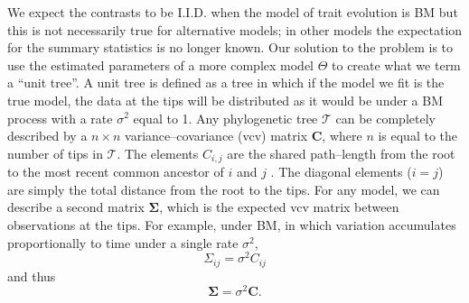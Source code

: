 \documentclass[a4paper,12pt]{article}
\begin{document}
We expect the contrasts to be I.I.D. when the model of trait evolution is BM but this is not necessarily true for alternative models; in other models the expectation for the summary statistics is no longer known. Our solution to the problem is to use the estimated parameters of a more complex model $\Theta$ to create what we term a ``unit tree''. A unit tree is defined as a tree in which if the model we fit is the true model, the data at the tips will be distributed as it would be under a BM process with a rate $\sigma^2$ equal to 1. Any phylogenetic tree $\mathcal{T}$ can be completely described by a $n \times n$ variance--covariance (vcv) matrix $\mathbf{C}$, where $n$ is equal to the number of tips in $\mathcal{T}$. The elements $C_{i,j}$ are the shared path--length from the root to the most recent common ancestor of $i$ and $j$ \citep{Piazza1975}. The diagonal elements ($i = j$) are simply the total distance from the root to the tips. For any model, we can describe a second matrix $\mathbf{\Sigma}$, which is the expected vcv matrix between observations at the tips. For example, under BM, in which variation accumulates proportionally to time under a single rate $\sigma^2$,
\begin{equation}
\Sigma_{ij} = \sigma^2 C_{ij}
\end{equation}
and thus
\begin{equation}
\mathbf{\Sigma} = \sigma^2 \mathbf{C}.
\end{equation}
\end{document}

